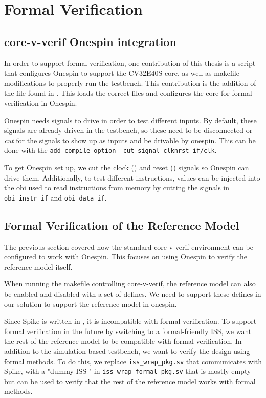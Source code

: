 \chapter{Formal Verification}
\label{ch:formal}

\section{core-v-verif Onespin integration}

In order to support formal verification, one contribution of this thesis is a script that configures Onespin \cite{onespinsolutionsgmbhUserManualOneSpin} to support the CV32E40S core, as well as makefile modifications to properly run the testbench. This contribution is the addition of the file  found in . This loads the correct files and configures the core for formal verification in Onespin. 

Onespin needs signals to drive in order to test different inputs. By default, these signals are already driven in the testbench, so these need to be disconnected or \textit{cut} for the signals to show up as inputs and be drivable by onespin\cite{ReferenceManualOneSpin}. This can be done with the \lstinline{add_compile_option -cut_signal clknrst_if/clk}.

To get Onespin set up, we cut the clock () and reset () signals so Onespin can drive them. Additionally, to test different instructions, values can be injected into the \acrfull{obi} \cite{siliconlabsincOBI} used to read instructions from memory by cutting the signals in \lstinline{obi_instr_if} and \lstinline{obi_data_if}.


\section{Formal Verification of the Reference Model}
\label{sec:formal_testbench}
\label{sec:formal_dummy}

The previous section covered how the standard core-v-verif environment can be configured to work with Onespin. This focuses on using Onespin to verify the reference model itself. 

When running the makefile controlling core-v-verif, the reference model can also be enabled and disabled with a set of defines. We need to support these defines in our solution to support the reference model in onespin.

Since Spike is written in \cpp, it is incompatible with formal verification. To support formal verification in the future by switching to a formal-friendly ISS, we want the rest of the reference model to be compatible with formal verification. In addition to the simulation-based testbench, we want to verify the design using formal methods. To do this, we replace \lstinline{iss_wrap_pkg.sv} that communicates with Spike, with a "dummy ISS " in \lstinline{iss_wrap_formal_pkg.sv} that is mostly empty but can be used to verify that the rest of the reference model works with formal methods.


